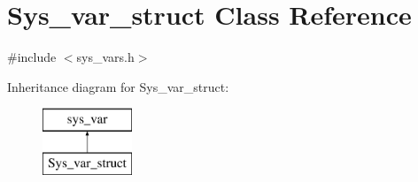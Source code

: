 \hypertarget{classSys__var__struct}{}\section{Sys\+\_\+var\+\_\+struct Class Reference}
\label{classSys__var__struct}


{\ttfamily \#include $<$sys\+\_\+vars.\+h$>$}

Inheritance diagram for Sys\+\_\+var\+\_\+struct\+:\begin{figure}[H]
\begin{center}
\leavevmode
\includegraphics[height=2.000000cm]{classSys__var__struct}
\end{center}
\end{figure}
